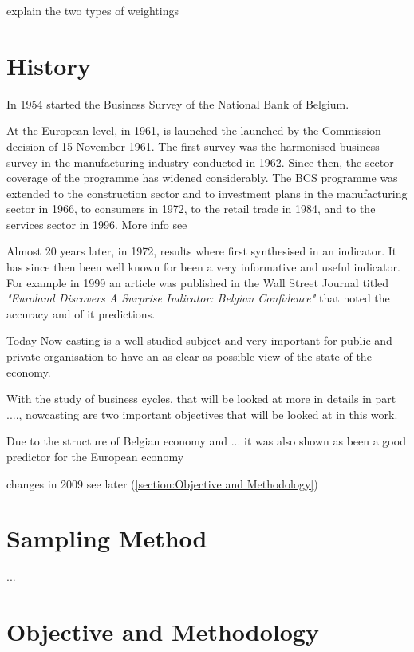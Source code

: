 \documentclass[12pt,a4paper,oneside]{book}
\begin{document}
explain the two types of weightings

\section{History}

In 1954 started the Business Survey of the National Bank of Belgium. 

At the European level, in 1961, is launched the launched by the Commission decision of 15 November 1961. The first survey was the harmonised business survey in the manufacturing industry conducted in 1962. Since then, the sector coverage of the programme has widened considerably. The BCS programme was extended to the construction sector and to investment plans in the manufacturing sector in 1966, to consumers in 1972, to the retail trade in 1984, and to the services sector in 1996.
More info see \citep{european_commission_joint_nodate}

Almost 20 years later, in 1972, results where first synthesised in an indicator. It has since then been well known for been a very informative and useful indicator. For example in 1999 an article was published in the Wall Street Journal titled \textit{"Euroland Discovers A Surprise Indicator: Belgian Confidence"} \citep{rhoads_euroland_1999} that noted the accuracy and of it predictions.

Today Now-casting is a well studied subject and very important for public and private organisation to have an as clear as possible view of the state of the economy.

With the study of business cycles, that will be looked at more in details in part ...., nowcasting are two important objectives that will be looked at in this work.

Due to the structure of Belgian economy and ... it was also shown as been a good predictor for the European economy \cite{vanhaelen_belgian_2000}

changes in 2009 see later (\autoref{section:Objective and Methodology})


\section{Sampling Method}

...

\section{Objective and Methodology}
\label{section:Objective and Methodology}
\end{document}
